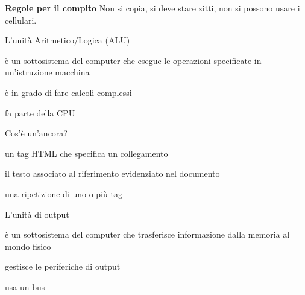 \documentclass{omrexam}
\date{21/02/2019}
\begin{document}
\textbf{Regole per il compito} Non si copia, si deve stare zitti, non si possono usare i cellulari.

\begin{questions}
\question
L'unità Aritmetico/Logica (ALU) 
\begin{choices}

\choice 
è un sottosistema del computer che esegue le operazioni specificate in un'istruzione macchina

\choice 
è in grado di fare calcoli complessi

\choice 
fa parte della CPU

\end{choices}
\question
Cos'è un'ancora? 
\begin{choices}

\choice 
un tag HTML che specifica un collegamento

\choice 
il testo associato al riferimento evidenziato nel documento

\choice 
una ripetizione di uno o più tag

\end{choices}
\question
L'unità di output 
\begin{choices}

\choice 
è un sottosistema del computer che trasferisce informazione dalla memoria al mondo fisico

\choice 
gestisce le periferiche di output

\choice 
usa un bus

\end{choices}

\end{questions}
\end{document}
